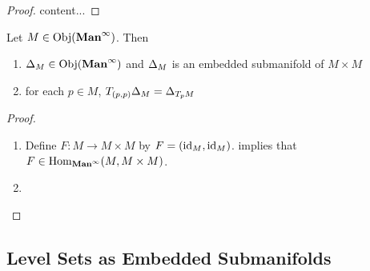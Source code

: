 \documentclass{book}
\begin{document}
	\begin{proof}
		content... 
	\end{proof}
	
	\begin{ex}
		Let $M \in \operatorname{Obj}(\operatorname*{\text{\textbf{Man}}^{\infty}})$. Then 
		\begin{enumerate}
			\item $\Delta_M \in \operatorname{Obj}(\operatorname*{\text{\textbf{Man}}^{\infty}})$ and $\Delta_M$ is an embedded submanifold of $M \times M$
			\item for each $p \in M$, $T_{(p,p)} \Delta_M = \Delta_{T_pM}$
		\end{enumerate}
	\end{ex}

	\begin{proof}\
		\begin{enumerate}
			\item Define $F: M \rightarrow M \times M$ by $F = (\operatorname{id}_M, \operatorname{id}_M)$.  implies that $F \in \operatorname{Hom}_{\operatorname*{\text{\textbf{Man}}^{\infty}}}(M, M \times M)$. 
			\item 
		\end{enumerate}
		
	\end{proof}
	





	
	
	
	
	
	
	
	
	
	
	
	
	
	
	
	
	
	
	
	
	
	
	
	
	
	
	
	
	
	
	
	
	
	
	
	
	

	\subsection{Level Sets as Embedded Submanifolds}
\end{document}
